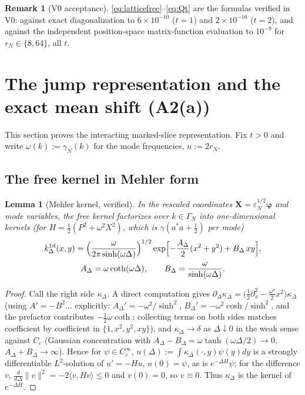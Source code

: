 \documentclass[11pt,a4paper]{article}
\theoremstyle{plain}
\newtheorem{lemma}[theorem]{Lemma}
\theoremstyle{definition}
\newtheorem{remark}[theorem]{Remark}
\newcommand{\eps}{\varepsilon}
\newcommand{\ip}[2]{\langle #1,#2\rangle}
\DeclareMathOperator{\ch}{cosh}
\DeclareMathOperator{\sh}{sinh}
\DeclareMathOperator{\cth}{coth}
\begin{document}
\begin{remark}[V0 acceptance]
\eqref{eq:latticefree}--\eqref{eq:Qt} are the formulas verified in V0: against
exact diagonalization to $6\times10^{-10}$ ($t=1$) and $2\times10^{-16}$
($t=2$), and against the independent position-space matrix-function evaluation
to $10^{-9}$ for $r_N\in\{8,64\}$, all $t$.
\end{remark}

\section{The jump representation and the exact mean shift (A2(a))}
\label{sec:jump}

This section proves the interacting marked-slice representation. Fix $t>0$ and
write $\omega(k):=\gamma_N(k)$ for the mode frequencies, $n:=2r_N$.

\subsection{The free kernel in Mehler form}

\begin{lemma}[Mehler kernel, verified]\label{lem:mehler}
In the rescaled coordinates $\bm X=\eps_N^{1/2}\bm\varphi$ and mode variables,
the free kernel factorizes over $k\in\Gamma_N$ into one-dimensional kernels
(for $H=\tfrac12(P^2+\omega^2X^2)$, which is $\gamma(a^*a+\tfrac12)$ per mode)
\begin{equation}
\begin{gathered}
 k^{\rm 1d}_\Delta(x,y)
 =\Bigl(\frac{\omega}{2\pi\sh(\omega\Delta)}\Bigr)^{1/2}
 \exp\Bigl[-\frac{A_\Delta}2(x^2+y^2)+B_\Delta\,xy\Bigr],\\
 A_\Delta=\omega\cth(\omega\Delta),\qquad
 B_\Delta=\frac{\omega}{\sh(\omega\Delta)} .
\end{gathered}
 \label{eq:mehler}
\end{equation}
\end{lemma}

\begin{proof}
Call the right side $\kappa_\Delta$. A direct computation gives
$\partial_\Delta\kappa_\Delta=\bigl(\tfrac12\partial_x^2
-\tfrac{\omega^2}2x^2\bigr)\kappa_\Delta$
(using $A'=-B^2$... explicitly: $A_\Delta'=-\omega^2/\sh^2$,
$B_\Delta'=-\omega^2\ch/\sh^2$, and the prefactor contributes
$-\tfrac12\omega\cth$; collecting terms on both sides matches coefficient by
coefficient in $\{1,x^2,y^2,xy\}$), and $\kappa_\Delta\to\delta$ as
$\Delta\downarrow0$ in the weak sense against $C_c$ (Gaussian concentration
with $A_\Delta-B_\Delta=\omega\tanh(\omega\Delta/2)\to0$,
$A_\Delta+B_\Delta\to\infty$). Hence for $\psi\in C_c^\infty$,
$u(\Delta):=\int\kappa_\Delta(\cdot,y)\psi(y)dy$ is a strongly differentiable
$L^2$-solution of $u'=-Hu$, $u(0)=\psi$, as is $e^{-\Delta H}\psi$; for the
difference $v$, $\tfrac d{d\Delta}\|v\|^2=-2\ip v{Hv}\le0$ and $v(0)=0$, so
$v\equiv0$. Thus $\kappa_\Delta$ is the kernel of $e^{-\Delta H}$.
\end{proof}
\end{document}
